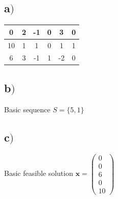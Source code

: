 \documentclass[a4paper,12pt]{article}
\begin{document}
  \subsection*{a\()\)}
     \begin{center}  
       \begin{tabular}{| c | c c c c c |}
         \hline
         0 & 2 & -1 & 0 & 3 & 0 \\
         \hline
         10 & 1 & 1 & 0 & 1 & 1 \\
         6 & 3 & -1 & 1 & -2 & 0 \\
         \hline
      \end{tabular}
    \end{center}
  \subsection*{b\()\)}
    Basic sequence \(S = \{ 5, 1\}\)
  \subsection*{c\()\)}
  Basic feasible solution \(\mathbf{x} = 
    \left( 
    \begin{array}{c}
      0 \\ 0 \\ 6 \\ 0 \\ 10
    \end{array}
    \right)
    \)
\end{document}
